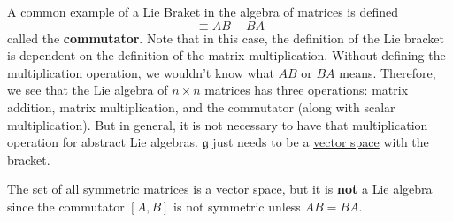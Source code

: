   \begin{example}
    \label{ex:matrix-commutator}
    A common example of a Lie Braket in the algebra of matrices is defined
    \begin{equation}
      [A, B] \equiv AB - BA
    \end{equation}
    called the \textbf{commutator}. Note that in this case, the definition of the Lie bracket is dependent on the definition of the matrix multiplication. Without defining the multiplication operation, we wouldn't know what $AB$ or $BA$ means. Therefore, we see that the \hyperref[def:lie-algebra]{Lie algebra} of $n \times n$ matrices has three operations: matrix addition, matrix multiplication, and the commutator (along with scalar multiplication). But in general, it is not necessary to have that multiplication operation for abstract Lie algebras. $\mathfrak{g}$ just needs to be a \hyperref[def:vector-space]{vector space} with the bracket.  
  \end{example}

  \begin{example}
    \label{ex:symmetric-matrices-do-not-form-a-lie-algebra}
    The set of all symmetric matrices is a \hyperref[def:vector-space]{vector space}, but it is \textbf{not} a Lie algebra since the commutator $[A,B]$ is not symmetric unless $A B = B A$. 
  \end{example}

